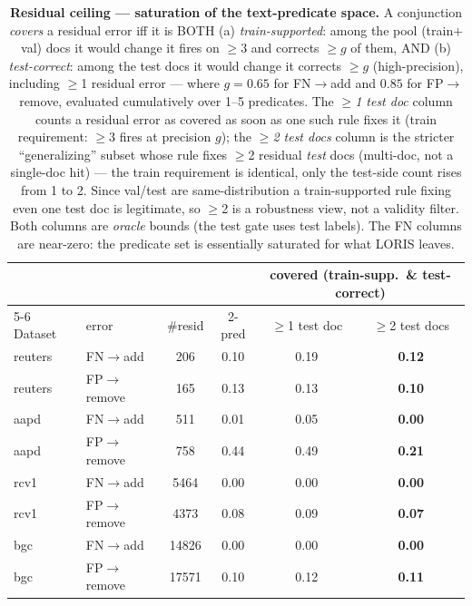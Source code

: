 \documentclass[11pt]{article}
\newcommand{\bld}[1]{\textbf{#1}}\newcommand{\gn}[1]{\textcolor{blue}{#1}}
\begin{document}
\begin{table}[h]\centering
\caption{\textbf{Residual ceiling --- saturation of the text-predicate space.} A conjunction
\emph{covers} a residual error iff it is BOTH (a) \emph{train-supported}: among the pool (train$+$val)
docs it would change it fires on $\geq$3 and corrects $\geq g$ of them, AND (b) \emph{test-correct}:
among the test docs it would change it corrects $\geq g$ (high-precision), including $\geq$1 residual
error --- where $g=0.65$ for FN$\to$add and $0.85$ for FP$\to$remove, evaluated cumulatively over 1--5
predicates. The \emph{$\geq$1 test doc} column counts a residual error as covered as soon as one such
rule fixes it (train requirement: $\geq$3 fires at precision $g$); the \emph{$\geq$2 test docs} column is
the stricter ``generalizing'' subset whose rule fixes $\geq$2 residual \emph{test} docs (multi-doc, not a
single-doc hit) --- the train requirement is identical, only the test-side count rises from 1 to 2. Since
val/test are same-distribution a train-supported rule fixing even one test doc is legitimate, so $\geq$2
is a robustness view, not a validity filter. Both columns are \emph{oracle} bounds (the test gate uses
test labels). The FN columns are near-zero: the predicate set is essentially saturated for what LORIS leaves.}
\label{tab:findd}\footnotesize\setlength{\tabcolsep}{5pt}
\begin{tabular}{llcccc}
\toprule
& & & & \multicolumn{2}{c}{covered (train-supp.\ \& test-correct)} \\
\cmidrule(lr){5-6}
Dataset & error & \#resid & 2-pred & $\geq$1 test doc & $\geq$2 test docs \\
\midrule
reuters & FN$\to$add & 206 & 0.10 & 0.19 & \bld{0.12} \\
reuters & FP$\to$remove & 165 & 0.13 & 0.13 & \bld{0.10} \\
aapd & FN$\to$add & 511 & 0.01 & 0.05 & \bld{0.00} \\
aapd & FP$\to$remove & 758 & 0.44 & 0.49 & \bld{0.21} \\
rcv1 & FN$\to$add & 5464 & 0.00 & 0.00 & \bld{0.00} \\
rcv1 & FP$\to$remove & 4373 & 0.08 & 0.09 & \bld{0.07} \\
bgc & FN$\to$add & 14826 & 0.00 & 0.00 & \bld{0.00} \\
bgc & FP$\to$remove & 17571 & 0.10 & 0.12 & \bld{0.11} \\
\bottomrule
\end{tabular}
\end{table}
\end{document}
